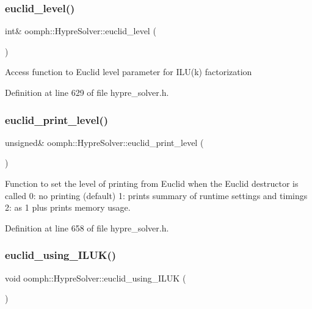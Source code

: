 \subsubsection{\texorpdfstring{euclid\+\_\+level()}{euclid\_level()}}
{\footnotesize\ttfamily int\& oomph\+::\+Hypre\+Solver\+::euclid\+\_\+level (\begin{DoxyParamCaption}{ }\end{DoxyParamCaption})\hspace{0.3cm}{\ttfamily [inline]}}

Access function to Euclid level parameter for I\+L\+U(k) factorization 

Definition at line 629 of file hypre\+\_\+solver.\+h.

\mbox{\label{classoomph_1_1HypreSolver_a367077503c12f1d5b6b57759cb3ed872}} 
\subsubsection{\texorpdfstring{euclid\+\_\+print\+\_\+level()}{euclid\_print\_level()}}
{\footnotesize\ttfamily unsigned\& oomph\+::\+Hypre\+Solver\+::euclid\+\_\+print\+\_\+level (\begin{DoxyParamCaption}{ }\end{DoxyParamCaption})\hspace{0.3cm}{\ttfamily [inline]}}



Function to set the level of printing from Euclid when the Euclid destructor is called 0\+: no printing (default) 1\+: prints summary of runtime settings and timings 2\+: as 1 plus prints memory usage. 



Definition at line 658 of file hypre\+\_\+solver.\+h.

\mbox{\label{classoomph_1_1HypreSolver_ad0206b4977a0e7aa78a386a8803ffcd4}} 
\subsubsection{\texorpdfstring{euclid\+\_\+using\+\_\+\+I\+L\+U\+K()}{euclid\_using\_ILUK()}}
{\footnotesize\ttfamily void oomph\+::\+Hypre\+Solver\+::euclid\+\_\+using\+\_\+\+I\+L\+UK (\begin{DoxyParamCaption}{ }\end{DoxyParamCaption})\hspace{0.3cm}{\ttfamily [inline]}}



